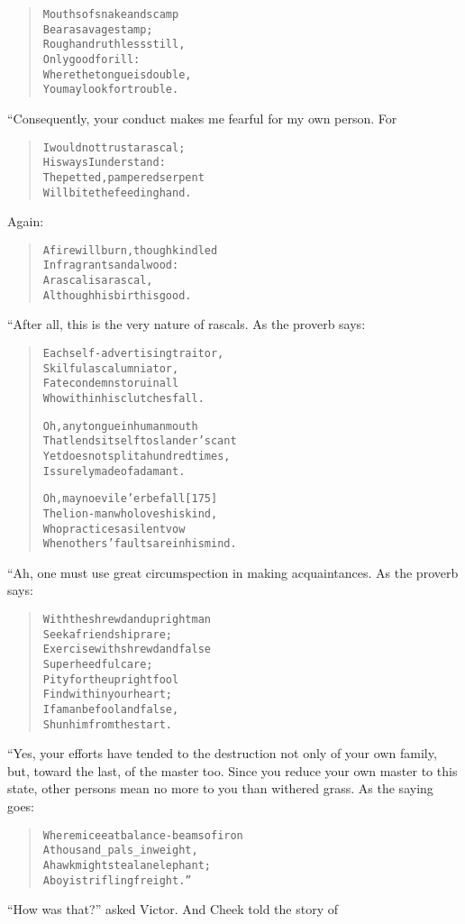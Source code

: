 \documentclass[article, twoside, 14pt]{memoir}
\renewenvironment{verbatim}{%
\begin{quote}%
\vskip -10pt%
\begin{alltt}\normalfont\large}{\end{alltt}%
\end{quote}%
\vskip -10pt
} %
\begin{document}
\begin{verbatim}
Mouths of snake and scamp
Bear a savage stamp;
Rough and ruthless still,
Only good for ill:
Where the tongue is double,
You may look for trouble.
\end{verbatim}
“Consequently, your conduct makes me fearful for my own person.
For

\begin{verbatim}
I would not trust a rascal;
    His ways I understand:
The petted, pampered serpent
    Will bite the feeding hand.
\end{verbatim}
Again:

\begin{verbatim}
A fire will burn, though kindled
    In fragrant sandalwood:
A rascal is a rascal,
    Although his birth is good.
\end{verbatim}
“After all, this is the very nature of rascals. As the proverb
says:

\begin{verbatim}
Each self-advertising traitor,
Skilful as calumniator,
Fate condemns to ruin all
Who within his clutches fall.

Oh, any tongue in human mouth
    That lends itself to slander's cant
Yet does not split a hundred times,
    Is surely made of adamant.

Oh, may no evil e'er befall                             [175]
    The lion-man who loves his kind,
Who practices a silent vow
    When others' faults are in his mind.
\end{verbatim}
“Ah, one must use great circumspection in making acquaintances. As
the proverb says:

\begin{verbatim}
With the shrewd and upright man
    Seek a friendship rare;
Exercise with shrewd and false
    Superheedful care;
Pity for the upright fool
    Find within your heart;
If a man be fool and false,
    Shun him from the start.
\end{verbatim}
“Yes, your efforts have tended to the destruction not only of your
own family, but, toward the last, of the master too. Since you
reduce your own master to this state, other persons mean no more to
you than withered grass. As the saying goes:

\begin{verbatim}
Where mice eat balance-beams of iron
    A thousand _pals_ in weight,
A hawk might steal an elephant;
    A boy is trifling freight.”
\end{verbatim}
``How was that?'' asked Victor. And Cheek told the story of
\end{document}
